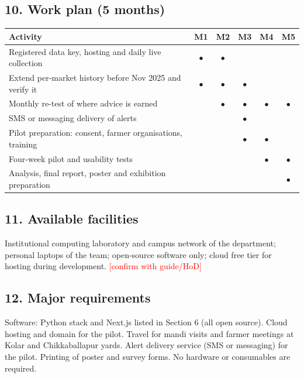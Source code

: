 \documentclass[11pt,a4paper]{article}
\newcommand{\todo}[1]{\textcolor{red}{[#1]}}
\begin{document}
\subsection*{10. Work plan (5 months)}
\begin{tabularx}{\textwidth}{@{}Xccccc@{}}
\toprule
Activity & M1 & M2 & M3 & M4 & M5\\
\midrule
Registered data key, hosting and daily live collection & $\bullet$ & $\bullet$ & & &\\
Extend per-market history before Nov 2025 and verify it & $\bullet$ & $\bullet$ & $\bullet$ & &\\
Monthly re-test of where advice is earned & & $\bullet$ & $\bullet$ & $\bullet$ & $\bullet$\\
SMS or messaging delivery of alerts & & & $\bullet$ & &\\
Pilot preparation: consent, farmer organisations, training & & & $\bullet$ & $\bullet$ &\\
Four-week pilot and usability tests & & & & $\bullet$ & $\bullet$\\
Analysis, final report, poster and exhibition preparation & & & & & $\bullet$\\
\bottomrule
\end{tabularx}

\subsection*{11. Available facilities}
Institutional computing laboratory and campus network of the department; personal laptops of the team; open-source software only; cloud free tier for hosting during development. \todo{confirm with guide/HoD}

\subsection*{12. Major requirements}
Software: Python stack and Next.js listed in Section 6 (all open source). Cloud hosting and domain for the pilot. Travel for mandi visits and farmer meetings at Kolar and Chikkaballapur yards. Alert delivery service (SMS or messaging) for the pilot. Printing of poster and survey forms. No hardware or consumables are required.
\end{document}
